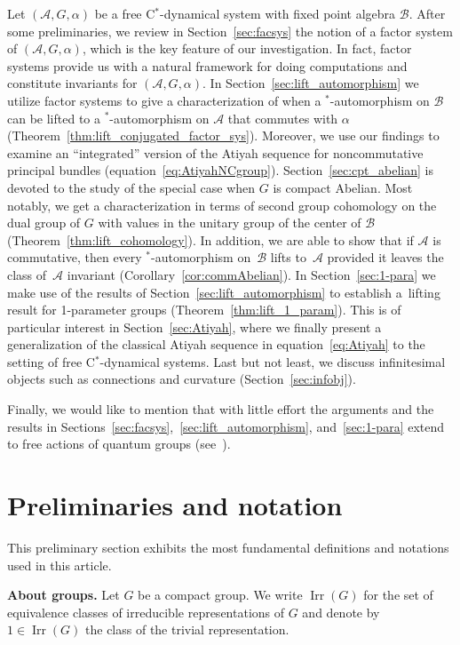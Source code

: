 \documentclass[10pt,a4paper]{amsart}
\numberwithin{equation}{section}
\newcommand*{\Star}{$^*$\nobreakdash}
\newcommand*{\alg}{\mathcal}		%
\newcommand*{\aA}{\alg{A}}			%
\newcommand*{\aB}{\alg{B}} 			%
\DeclareMathOperator{\Irrep}{Irr} 			%
\begin{document}
Let $(\aA,G,\alpha)$ be a free C\Star-dynamical system with fixed point algebra $\aB$.
After some preliminaries, we review in Section~\ref{sec:facsys} the notion of a factor system of $(\aA,G,\alpha)$, which is the key feature of our investigation.
In fact, factor systems provide us with a natural framework for doing computations and constitute invariants for $(\aA,G,\alpha)$.
In Section~\ref{sec:lift_automorphism} we utilize factor systems to give a characterization of when a \Star-automorphism on $\aB$ can be lifted to a \Star-automorphism on $\aA$ that commutes with $\alpha$ (Theorem~\ref{thm:lift_conjugated_factor_sys}).
Moreover, we use our findings to examine an ``integrated'' version of the Atiyah sequence for noncommutative principal bundles (equation~\eqref{eq:AtiyahNCgroup}).
Section~\ref{sec:cpt_abelian} is devoted to the study of the special case when $G$ is compact Abelian.
Most notably, we get a characterization in terms of second group cohomology on the dual group of $G$ with values in the unitary group of the center of $\aB$ (Theorem~\ref{thm:lift_cohomology}).
In addition, we are able to show that if $\aA$ is commutative, then every \Star-automorphism on~$\aB$ lifts to~$\aA$ provided it leaves the class of~$\aA$ invariant (Corollary~\ref{cor:commAbelian}).
In Section~\ref{sec:1-para} we make use of the results of Section~\ref{sec:lift_automorphism} to establish a~lifting result for 1-parameter groups (Theorem~\ref{thm:lift_1_param}).
This is of particular interest in Section~\ref{sec:Atiyah}, where we finally present a generalization of the classical Atiyah sequence in equation~\eqref{eq:Atiyah} to the setting of free C\Star-dynamical systems.
Last but not least, we discuss infinitesimal objects such as connections and curvature (Section~\ref{sec:infobj}).

Finally, we would like to mention that with little effort the arguments and the results in Sections~\ref{sec:facsys},~\ref{sec:lift_automorphism}, and~\ref{sec:1-para} extend to free actions of quantum groups (see~\cite{SchWa17c}).
	
\section{Preliminaries and notation}\label{sec:pre}

This preliminary section exhibits the most fundamental definitions and notations used in this article.

{\bf About groups.}
Let $G$ be a compact group.
We write $\Irrep(G)$ for the set of equivalence classes of irreducible representations of $G$ and denote by $1 \in \Irrep(G)$ the class of the trivial representation.
\end{document}
